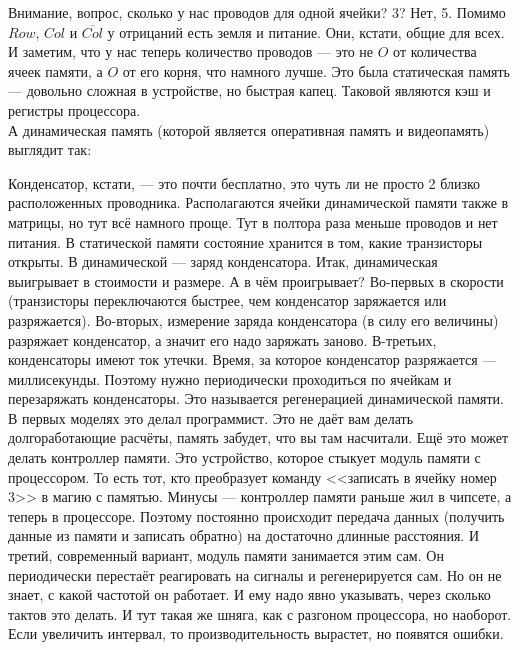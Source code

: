 \documentclass{article}
\begin{document}
    Внимание, вопрос, сколько у нас проводов для одной ячейки? 3? Нет, 5. Помимо $Row$, $Col$ и $\overline{Col}$ у отрицаний есть земля и питание. Они, кстати, общие для всех. И заметим, что у нас теперь количество проводов --- это не $O$ от количества ячеек памяти, а $O$ от его корня, что намного лучше. Это была статическая память --- довольно сложная в устройстве, но быстрая капец. Таковой являются кэш и регистры процессора.\\
    А динамическая память (которой является оперативная память и видеопамять) выглядит так:
    \begin{center}
    \end{center}
    Конденсатор, кстати, --- это почти бесплатно, это чуть ли не просто 2 близко расположенных проводника. Располагаются ячейки динамической памяти также в матрицы, но тут всё намного проще. Тут в полтора раза меньше проводов и нет питания. В статической памяти состояние хранится в том, какие транзисторы открыты. В динамической --- заряд конденсатора. Итак, динамическая выигрывает в стоимости и размере. А в чём проигрывает? Во-первых в скорости (транзисторы переключаются быстрее, чем конденсатор заряжается или разряжается). Во-вторых, измерение заряда конденсатора (в силу его величины) разряжает конденсатор, а значит его надо заряжать заново. В-третьих, конденсаторы имеют ток утечки. Время, за которое конденсатор разряжается --- миллисекунды. Поэтому нужно периодически проходиться по ячейкам и перезаряжать конденсаторы. Это называется регенерацией динамической памяти. В первых моделях это делал программист. Это не даёт вам делать долгоработающие расчёты, память забудет, что вы там насчитали. Ещё это может делать контроллер памяти. Это устройство, которое стыкует модуль памяти с процессором. То есть тот, кто преобразует команду <<записать в ячейку номер 3>> в магию с памятью. Минусы --- контроллер памяти раньше жил в чипсете, а теперь в процессоре. Поэтому постоянно происходит передача данных (получить данные из памяти и записать обратно) на достаточно длинные расстояния. И третий, современный вариант, модуль памяти занимается этим сам. Он периодически перестаёт реагировать на сигналы и регенерируется сам. Но он не знает, с какой частотой он работает. И ему надо явно указывать, через сколько тактов это делать. И тут такая же шняга, как с разгоном процессора, но наоборот. Если увеличить интервал, то производительность вырастет, но появятся ошибки.\\
\end{document}
